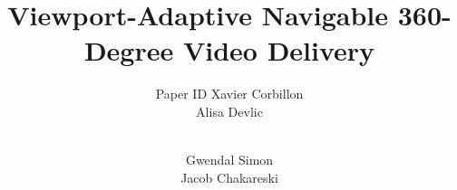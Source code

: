 \documentclass{sig-alternate}
\title{Viewport-Adaptive Navigable 360-Degree Video Delivery}
\author{
\alignauthor
\ifdoubleBlinded
        Paper ID
\else
  Xavier Corbillon\\
  \affaddr{T\'{e}l\'{e}com Bretagne, France}%
\alignauthor
  Alisa Devlic\\
  \affaddr{T\'{e}l\'{e}com Bretagne, France} \\
\and
\alignauthor
  Gwendal Simon\\
  \affaddr{T\'{e}l\'{e}com Bretagne, France}%
\alignauthor
  Jacob Chakareski\\
  \affaddr{Univ. Alabama, USA}
\fi
}
\begin{document}

\maketitle



\glsresetall




% 







%

%
%
%
%
%
%
%
%



\newpage
%
%

%

\end{document}
